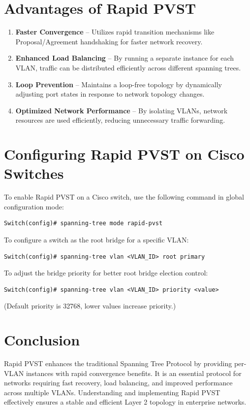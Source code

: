 \documentclass[a4paper]{book}
\begin{document}
\section*{Advantages of Rapid PVST}
\begin{enumerate}
	\item \textbf{Faster Convergence} – Utilizes rapid transition mechanisms like Proposal/Agreement handshaking for faster network recovery.
	\item \textbf{Enhanced Load Balancing} – By running a separate instance for each VLAN, traffic can be distributed efficiently across different spanning trees.
	\item \textbf{Loop Prevention} – Maintains a loop-free topology by dynamically adjusting port states in response to network topology changes.
	\item \textbf{Optimized Network Performance} – By isolating VLANs, network resources are used efficiently, reducing unnecessary traffic forwarding.
\end{enumerate}

\section*{Configuring Rapid PVST on Cisco Switches}
To enable Rapid PVST on a Cisco switch, use the following command in global configuration mode:

\begin{lstlisting}
Switch(config)# spanning-tree mode rapid-pvst
\end{lstlisting}

To configure a switch as the root bridge for a specific VLAN:

\begin{lstlisting}
Switch(config)# spanning-tree vlan <VLAN_ID> root primary
\end{lstlisting}

To adjust the bridge priority for better root bridge election control:

\begin{lstlisting}
Switch(config)# spanning-tree vlan <VLAN_ID> priority <value>
\end{lstlisting}

(Default priority is 32768, lower values increase priority.)

\section*{Conclusion}
Rapid PVST enhances the traditional Spanning Tree Protocol by providing per-VLAN instances with rapid convergence benefits. It is an essential protocol for networks requiring fast recovery, load balancing, and improved performance across multiple VLANs. Understanding and implementing Rapid PVST effectively ensures a stable and efficient Layer 2 topology in enterprise networks.
\end{document}
